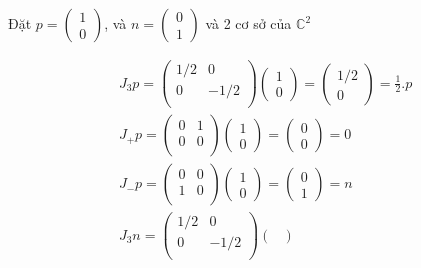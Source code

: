 \documentclass{report}
\begin{document}
Đặt \( p = \begin{pmatrix}
		1 \\ 0
	\end{pmatrix} \), và \( n = \begin{pmatrix}
		0 \\ 1
	\end{pmatrix} \) và 2 cơ sở của \( \mathbb{C}^{2} \)
	
	\begin{align*}
		& J_{3} p = \begin{pmatrix}
			1/2 & 0 \\
			0 & -1/2 \\
		\end{pmatrix} \begin{pmatrix}
			1 \\ 0
		\end{pmatrix} = \begin{pmatrix}
			1/2 \\ 0
		\end{pmatrix} = \frac{1}{2}.p \\
		& J_{+} p = \begin{pmatrix}
			0 & 1 \\
			0 & 0 \\
		\end{pmatrix} \begin{pmatrix}
			1 \\ 0
		\end{pmatrix} = \begin{pmatrix}
			0 \\ 0
		\end{pmatrix} = 0 \\
		& J_{-} p = \begin{pmatrix}
			0 & 0 \\
			1 & 0 \\
		\end{pmatrix} \begin{pmatrix}
			1 \\ 0
		\end{pmatrix} = \begin{pmatrix}
			0 \\ 1
		\end{pmatrix} = n \\
		& J_{3} n = \begin{pmatrix}
			1/2 & 0 \\
			0 & -1/2 \\
		\end{pmatrix} \begin{pmatrix}

\end{pmatrix}
\end{align*}
\end{document}
